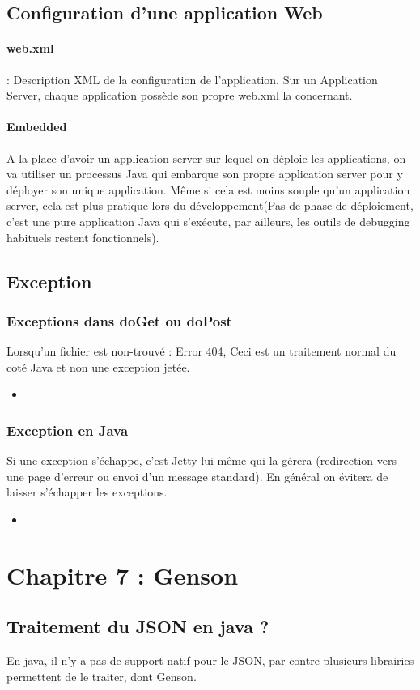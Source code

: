 \documentclass{article}[12pt]
\newcommand{\JavaScript}[2]{
	\begin{itemize}
		\item[]
	\end{itemize}
}
\begin{document}
\subsection{Configuration d'une application Web}
\paragraph{web.xml} : Description XML de la configuration de l'application. Sur un Application Server, chaque application possède son propre web.xml la concernant.
\paragraph{Embedded}
A la place d'avoir un application server sur lequel on déploie les applications, on va utiliser un processus Java qui embarque son propre application server pour y déployer son unique application. Même si cela est moins souple qu'un application server, cela est plus pratique lors du développement(Pas de phase de déploiement, c'est une pure application Java qui s'exécute, par ailleurs, les outils de debugging habituels restent fonctionnels).
\subsection{Exception}
\subsubsection{Exceptions dans doGet ou doPost}
Lorsqu'un fichier est non-trouvé : Error 404, Ceci est un traitement normal du coté Java et non une exception jetée.
\JavaScript{error404}{Gestion de l'erreur 404}
\subsubsection{Exception en Java}
Si une exception s'échappe, c'est Jetty lui-même qui la gérera (redirection vers une page d'erreur ou envoi d'un message standard). En général on évitera de laisser s'échapper les exceptions.
\JavaScript{gestion_exception}{Gestion des Exceptions}
\section{Chapitre 7 : Genson}
\subsection{Traitement du JSON en java ? }
En java, il n'y a pas de support natif pour le JSON, par contre plusieurs librairies permettent de le traiter, dont Genson.
\end{document}
